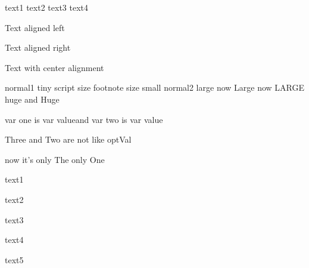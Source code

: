 \documentclass{article}
\begin{document}
\begin{titlepage}
    text1 \pagebreak \newline text2
    text3 \nopagebreak \newline \vfill text4

    \begin{flushleft}
        Text aligned left
    \end{flushleft}

    \begin{flushright}
        Text aligned right
    \end{flushright}

    \begin{center}
        Text with center alignment
    \end{center}

    \newpage
    normal1 \tiny tiny \scriptsize script size \footnotesize footnote size
    \small small \normalsize normal2 \large large \Large now Large \LARGE now
    LARGE \huge huge \Huge and Huge
    \normalsize

    \def\varA{var value}
    \let\varB\varA

    var one is \varA and var two is \varB

\newcommand{\egComm}[3][optVal]{#3 and #2 are not like #1}
\egComm{Two}{Three}

\renewcommand{\egComm}[1]{now it's only #1}
\egComm{The only One}

    text1 \par text2 \par \medskip text3 \par \bigskip text4 \par
    \vspace{\baselineskip} text5


    \end{titlepage}
\end{document}
